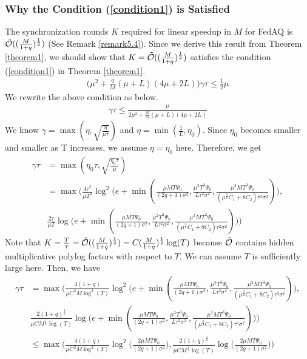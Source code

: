 \documentclass[11pt]{article}
\begin{document}
\subsubsection{Why the Condition (\ref{condition1}) is Satisfied}
\label{app:proof_condition2}

The synchronization rounds $K$ required for linear speedup in $M$ for FedAQ is $\Tilde{\mathcal{O}}((\frac{M}{1+q})^{\frac{1}{2}})$ (See Remark \ref{remark5.4}). Since we derive this result from Theorem \ref{theorem1}, we should show that $K = \Tilde{\mathcal{O}}((\frac{M}{1+q})^{\frac{1}{2}})$ satisfies the condition (\ref{condition1}) in Theorem \ref{theorem1}.
\begin{align*}
     \Big(\mu^2 + \frac{q}{M}(\mu+L)(4\mu+2L)\Big)\gamma\tau \leq \frac{1}{2}\mu
\end{align*}
We rewrite the above condition as below.
\begin{align} \label{theorem1_condition}
    \gamma\tau \leq \frac{\mu}{2\mu^2+\frac{2q}{M}(\mu+L)(4\mu+2L)}
\end{align}
We know $\gamma = \max(\eta, \sqrt{\frac{\eta}{\mu\tau}})$ and $\eta = \min(\frac{1}{L}, \eta_0)$. Since $\eta_0$ becomes smaller and smaller as T increases, we assume $\eta = \eta_0$ here. Therefore, we get
\begin{align*}
    \gamma\tau &= \max(\eta_0\tau, \sqrt{\frac{\eta_0\tau}{\mu}}) \\
    &= \max\Big(\frac{4\tau^2}{\mu T^2}\log^2\Big(e+\min(\frac{\mu M T \Psi_0}{(2q+1)\sigma^2}, \frac{\mu^2 T^3\Psi_0}{L\tau^2\sigma^2}, \frac{\mu^3 M T^3\Psi_0}{(\mu^{\frac{3}{2}}C_1+8C_2)\tau^2\sigma^2}) \Big), \\
    &\frac{2\tau}{\mu T}\log\Big(e+\min(\frac{\mu M T \Psi_0}{(2q+1)\sigma^2}, \frac{\mu^2 T^3\Psi_0}{L\tau^2\sigma^2}, \frac{\mu^3 M T^3\Psi_0}{(\mu^{\frac{3}{2}}C_1+8C_2)\tau^2\sigma^2}) \Big)\Big)
\end{align*}
Note that $K=\frac{T}{\tau}=\Tilde{\mathcal{O}}((\frac{M}{1+q})^{\frac{1}{2}})=C(\frac{M}{1+q})^{\frac{1}{2}} \log(T)$ because $\Tilde{\mathcal{O}}$ contains hidden multiplicative polylog factors with respect to $T$. We can assume $T$ is sufficiently large here. Then, we have
\begin{align*}
    \gamma\tau &= \max\Big(\frac{4(1+q)}{\mu C^2M\log^2(T)}\log^2\Big(e+\min(\frac{\mu M T \Psi_0}{(2q+1)\sigma^2}, \frac{\mu^2 T^3\Psi_0}{L\tau^2\sigma^2}, \frac{\mu^3 M T^3\Psi_0}{(\mu^{\frac{3}{2}}C_1+8C_2)\tau^2\sigma^2}) \Big), \\
    &\frac{2(1+q)^{\frac{1}{2}}}{\mu CM^{\frac{1}{2}}\log(T)}\log\Big(e+\min(\frac{\mu M T \Psi_0}{(2q+1)\sigma^2}, \frac{\mu^2 T^3\Psi_0}{L\tau^2\sigma^2}, \frac{\mu^3 M T^3\Psi_0}{(\mu^{\frac{3}{2}}C_1+8C_2)\tau^2\sigma^2}) \Big)\Big) \\
    &\leq \max\Big(\frac{4(1+q)}{\mu C^2M\log^2(T)}\log^2\Big(\frac{2\mu M T \Psi_0}{(2q+1)\sigma^2}\Big), \frac{2(1+q)^{\frac{1}{2}}}{\mu CM^{\frac{1}{2}}\log(T)}\log\Big(\frac{2\mu M T \Psi_0}{(2q+1)\sigma^2} \Big)\Big)
\end{align*}
\end{document}
